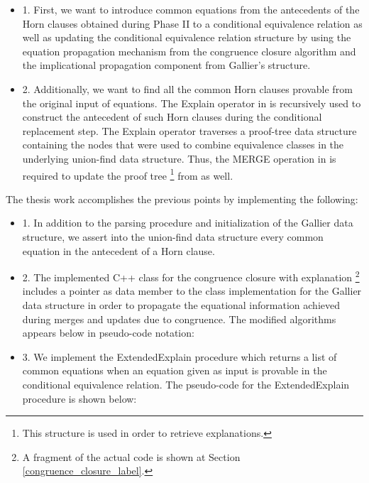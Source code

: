 \begin{itemize}
  \item[] 1. First, we want to introduce 
    common equations from the antecedents of 
    the Horn clauses obtained during Phase II
    to a conditional equivalence relation as well
    as updating the conditional equivalence relation 
    structure by using the equation propagation mechanism
    from the congruence closure algorithm and 
    the implicational propagation component 
    from Gallier's structure.
  \item[] 2. Additionally, we want to find all the common
    Horn clauses provable from the original input 
    of equations. The Explain operator in 
    \cite{10.1007/978-3-540-32033-3_33} is recursively 
    used to construct 
    the antecedent of such Horn clauses during the 
    conditional replacement step. The Explain operator 
    traverses a proof-tree data structure containing the nodes
    that were used to combine equivalence classes 
    in the underlying union-find data structure.
    Thus, the MERGE operation in \cite{GALLIER1987233} is
    required to update the proof tree 
    \footnote{This structure is used in order to retrieve
    explanations.}
    from \cite{10.1007/978-3-540-32033-3_33} as well.
\end{itemize}

The thesis work accomplishes the previous
points by implementing the following:

\begin{itemize}
  \item[] 1. In addition to the parsing procedure
    and initialization of the Gallier data structure,
    we assert into the union-find data structure 
    every common equation in the 
    antecedent of a Horn clause.
  \item[] 2. The implemented C++ class for 
    the congruence closure with explanation 
    \footnote{
      A fragment of the actual code is shown
      at Section \ref{congruence_closure_label}.
    } 
    includes a pointer as data member to the 
    class implementation
    for the Gallier data structure in order to propagate 
    the equational information achieved during
    merges and updates due to congruence. The modified 
    algorithms appears below in pseudo-code notation:

    
    
    

  \item[] 3. We implement the ExtendedExplain 
    procedure which returns a list of common equations
    when an equation given as input is provable in the 
    conditional equivalence relation. The pseudo-code
    for the ExtendedExplain procedure is shown 
    below:

    

\end{itemize}


